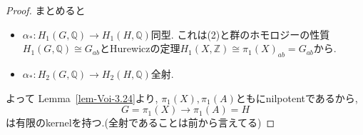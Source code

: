 \documentclass[dvipdfmx,a4paper,11pt]{article} %
\theoremstyle{definition}
\theoremstyle{remark}
\numberwithin{equation}{section}
\newcommand{\R}{\mathbb{R}}
\newcommand{\Z}{\mathbb{Z}}
\newcommand{\C}{\mathbb{C}}
\newcommand{\Q}{\mathbb{Q}}
\begin{document}
\begin{proof}
まとめると
\begin{itemize}
\item  \( \alpha_* \colon H_1(G, \mathbb{Q}) \to H_1(H, \mathbb{Q}) \)同型. これは(2)と群のホモロジーの性質$H_1(G, \mathbb{Q}) \cong G_{ab}$とHurewiczの定理$H_1(X, \Z) \cong \pi_1(X)_{ab}=G_{ab}$から. 
\item   \( \alpha_* \colon H_2(G, \mathbb{Q}) \to H_2(H, \mathbb{Q}) \)全射. 
\end{itemize}
よって Lemma~\ref{lem-Voi-3.24}より, $\pi_1(X),  \pi_1(A)$ともにnilpotentであるから, 
\[G=\pi_1(X) \to \pi_1(A)=H
\]
は有限のkernelを持つ.(全射であることは前から言えてる)
\end{proof}

\end{document}
